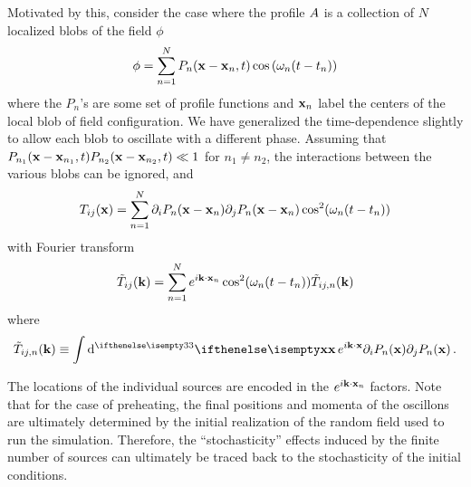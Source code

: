 \documentclass{revtex4}
\begin{document}
Motivated by this, consider the case where the profile $A$ is a collection of $N$ localized blobs of the field $\phi$
\begin{equation}
  \phi = \sum_{n=1}^{N} P_n({\bf x-x}_n,t)\cos\left(\omega_n(t-t_n)\right)
\end{equation}
where the $P_n$'s are some set of profile functions and ${\bf x}_n$ label the centers of the local blob of field configuration.
We have generalized the time-dependence slightly to allow each blob to oscillate with a different phase.
Assuming that $P_{n_1}({\bf x-x}_{n_1},t)P_{n_{2}}({\bf x - x}_{n_2},t) \ll 1$ for $n_1 \neq n_2$, the interactions between the various blobs can be ignored, and
\begin{equation}
  T_{ij}({\bf x}) = \sum_{n=1}^N\partial_iP_n({\bf x-x}_n)\partial_jP_n({\bf x-x}_n)\cos^2(\omega_n(t-t_n))
\end{equation}
with Fourier transform
\begin{equation}
  \tilde{T}_{ij}({\bf k}) = \sum_{n=1}^Ne^{i{\bf k}\cdot{\bf x}_n}\cos^2(\omega_n(t-t_n))\tilde{T}_{ij,n}({\bf k})
\end{equation}
where
\begin{equation}
  \tilde{T}_{ij,n}(\kvec) \equiv \int \ud[3]{\xvec}e^{i\kvec\cdot\xvec}\partial_iP_n(\xvec)\partial_jP_n(\xvec) \, .
\end{equation}

The locations of the individual sources are encoded in the $e^{i{\bf k}\cdot{\bf x}_n}$ factors.
Note that for the case of preheating, the final positions and momenta of the oscillons are ultimately determined by the initial realization of the random field used to run the simulation.
Therefore, the ``stochasticity'' effects induced by the finite number of sources can ultimately be traced back to the stochasticity of the initial conditions.
\end{document}
